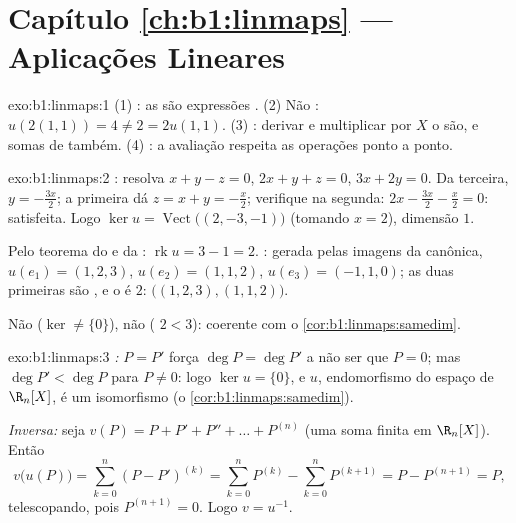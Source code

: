 \section*{Capítulo \ref{ch:b1:linmaps} --- Aplicações Lineares}

\begin{solution}{exo:b1:linmaps:1}
(1) : as  são expressões . (2) Não :
$u(2(1,1)) = 4 \neq 2 = 2u(1,1)$. (3) : derivar e multiplicar por $X$ o são, e somas de
 também. (4) : a avaliação respeita as
operações ponto a ponto.
\end{solution}

\begin{solution}{exo:b1:linmaps:2}
: resolva $x + y - z = 0$, $2x + y + z = 0$, $3x + 2y = 0$. Da terceira, $y = -\frac{3x}{2}$; a primeira
dá $z = x + y =
-\frac x2$; verifique na segunda: $2x - \frac{3x}{2} - \frac x2 = 0$: satisfeita. Logo $\ker u = \operatorname{Vect}\bigl((2, -3, -1)\bigr)$
(tomando $x = 2$), dimensão $1$.

Pelo teorema do  e da : $\operatorname{rk} u = 3 - 1 = 2$. : gerada pelas
imagens da  canônica, $u(e_1) = (1,2,3)$, $u(e_2) =
(1,1,2)$, $u(e_3) = (-1,1,0)$; as duas primeiras são
, e o  é $2$:  $\bigl((1,2,3), (1,1,2)\bigr)$.

Não  ($\ker \neq \{0\}$), não  ( $2 < 3$): coerente com
o \cref{cor:b1:linmaps:samedim}.
\end{solution}

\begin{solution}{exo:b1:linmaps:3}
\emph{:} $P = P'$ força $\deg P = \deg P'$ a não ser que $P = 0$; mas $\deg P' < \deg P$
para $P \neq 0$: logo $\ker u = \{0\}$, e $u$, endomorfismo  do espaço de
 $\R_n[X]$, é um isomorfismo (o \cref{cor:b1:linmaps:samedim}).

\emph{Inversa:} seja $v(P) = P + P' + P'' + \dots + P^{(n)}$ (uma soma finita em $\R_n[X]$). Então
\[
v\bigl(u(P)\bigr) = \sum_{k=0}^{n} (P - P')^{(k)}
= \sum_{k=0}^{n} P^{(k)} - \sum_{k=0}^{n} P^{(k+1)}
= P - P^{(n+1)} = P ,
\]
telescopando, pois $P^{(n+1)} = 0$. Logo $v = u^{-1}$.
\end{solution}

